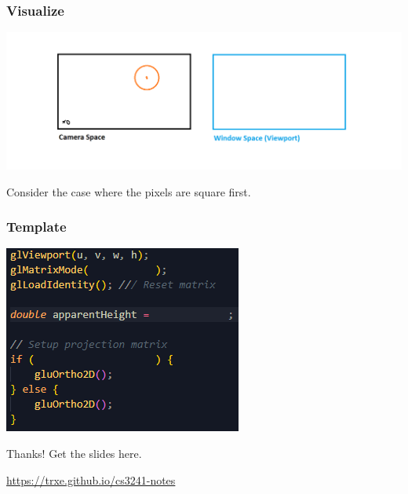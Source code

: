 \documentclass{beamer}
\begin{document}
\begin{frame}
    \frametitle{Visualize}

    \begin{center}
        \includegraphics[scale=0.4]{q7-cam-win.png}
    \end{center}

    \begin{tcolorbox}
        Consider the case where the pixels are square first.
    \end{tcolorbox}

\end{frame}

\begin{frame}
    \frametitle{Template}

    \begin{center}
        \includegraphics[scale=1.4]{q7.png}
    \end{center}

\end{frame}

\ThankYou
\begin{frame}
    Thanks! Get the slides here.\\
    \vspace{2em}
    \scalebox{3}{\faGithub}\par\bigskip
    \url{https://trxe.github.io/cs3241-notes}
\end{frame}
\end{document}
